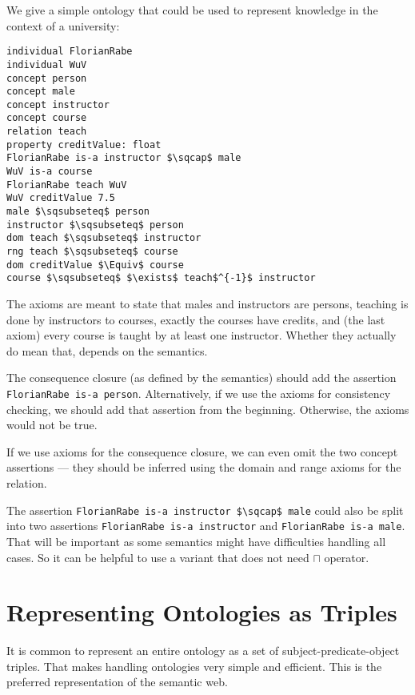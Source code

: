 \begin{example}\label{ex:bol}
We give a simple ontology that could be used to represent knowledge in the context of a university:

\begin{lstlisting}
individual FlorianRabe
individual WuV
concept person
concept male
concept instructor
concept course
relation teach
property creditValue: float
FlorianRabe is-a instructor $\sqcap$ male
WuV is-a course
FlorianRabe teach WuV
WuV creditValue 7.5
male $\sqsubseteq$ person
instructor $\sqsubseteq$ person
dom teach $\sqsubseteq$ instructor
rng teach $\sqsubseteq$ course
dom creditValue $\Equiv$ course
course $\sqsubseteq$ $\exists$ teach$^{-1}$ instructor
\end{lstlisting}

The axioms are meant to state that males and instructors are persons, teaching is done by instructors to courses, exactly the courses have credits, and (the last axiom) every course is taught by at least one instructor.
Whether they actually do mean that, depends on the semantics.

The consequence closure (as defined by the semantics) should add the assertion \texttt{FlorianRabe is-a person}.
Alternatively, if we use the axioms for consistency checking, we should add that assertion from the beginning.
Otherwise, the axioms would not be true.

If we use axioms for the consequence closure, we can even omit the two concept assertions --- they should be inferred using the domain and range axioms for the relation.

The assertion \lstinline|FlorianRabe is-a instructor $\sqcap$ male| could also be split into two assertions
\lstinline|FlorianRabe is-a instructor| and \lstinline|FlorianRabe is-a male|.
That will be important as some semantics might have difficulties handling all cases.
So it can be helpful to use a variant that does not need $\sqcap$ operator.
\end{example}

\section{Representing Ontologies as Triples}\label{sec:onto:triple}

It is common to represent an entire ontology as a set of subject-predicate-object triples.
That makes handling ontologies very simple and efficient.
This is the preferred representation of the semantic web.

